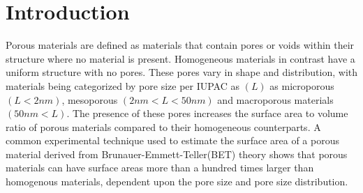 
\section{Introduction}
\label{section:introduction}

Porous materials are defined as materials that contain pores or voids within their structure where no material is present. 
Homogeneous materials in contrast have a uniform structure with no pores. These pores vary in shape and distribution, with materials 
being categorized by pore size per IUPAC as $(L)$ as microporous $(L < 2nm)$, mesoporous $(2nm < L < 50nm)$ and macroporous materials 
$(50nm < L)$. \cite{sing_reporting_1985} The presence of these pores increases the surface area to volume 
ratio of porous materials compared to their homogeneous counterparts. A common experimental technique used to estimate the surface area 
of a porous material derived from Brunauer-Emmett-Teller(BET) theory shows that porous materials can have surface areas more than a 
hundred times larger than homogenous materials, dependent upon the pore size and pore size distribution. \cite{shimizu_surface_2022}

